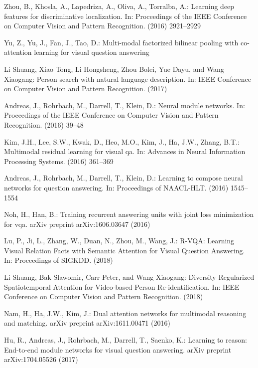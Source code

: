 \documentclass[runningheads]{llncs}
\begin{document}
\begin{thebibliography}{8}
Zhou, B., Khosla, A., Lapedriza, A., Oliva, A., Torralba, A.:
\newblock Learning deep features for discriminative localization.
\newblock In: Proceedings of the IEEE Conference on Computer Vision and Pattern
  Recognition. (2016)  2921--2929

Yu, Z., Yu, J., Fan, J., Tao, D.:
\newblock Multi-modal factorized bilinear pooling with co-attention learning
  for visual question answering

Li Shuang, Xiao Tong, Li Hongsheng, Zhou Bolei, Yue Dayu, and Wang Xiaogang:
\newblock Person search with natural language description.
\newblock In: IEEE Conference on Computer Vision and Pattern Recognition. (2017)
 
Andreas, J., Rohrbach, M., Darrell, T., Klein, D.:
\newblock Neural module networks.
\newblock In: Proceedings of the IEEE Conference on Computer Vision and Pattern
  Recognition. (2016)  39--48

Kim, J.H., Lee, S.W., Kwak, D., Heo, M.O., Kim, J., Ha, J.W., Zhang, B.T.:
\newblock Multimodal residual learning for visual qa.
\newblock In: Advances in Neural Information Processing Systems. (2016)
  361--369

Andreas, J., Rohrbach, M., Darrell, T., Klein, D.:
\newblock Learning to compose neural networks for question answering.
\newblock In: Proceedings of NAACL-HLT. (2016)  1545--1554

Noh, H., Han, B.:
\newblock Training recurrent answering units with joint loss minimization for
  vqa.
\newblock arXiv preprint arXiv:1606.03647 (2016)

Lu, P., Ji, L., Zhang, W., Duan, N., Zhou, M., Wang, J.:
\newblock R-VQA: Learning Visual Relation Facts with Semantic Attention for Visual Question Answering.
\newblock In: Proceedings of SIGKDD. (2018)

Li Shuang, Bak Slawomir, Carr Peter, and Wang Xiaogang:
\newblock Diversity Regularized Spatiotemporal Attention for Video-based Person Re-identification.
\newblock In: IEEE Conference on Computer Vision and Pattern Recognition. (2018)


Nam, H., Ha, J.W., Kim, J.:
\newblock Dual attention networks for multimodal reasoning and matching.
\newblock arXiv preprint arXiv:1611.00471 (2016)

Hu, R., Andreas, J., Rohrbach, M., Darrell, T., Saenko, K.:
\newblock Learning to reason: End-to-end module networks for visual question
  answering.
\newblock arXiv preprint arXiv:1704.05526 (2017)



\end{thebibliography}
\end{document}
